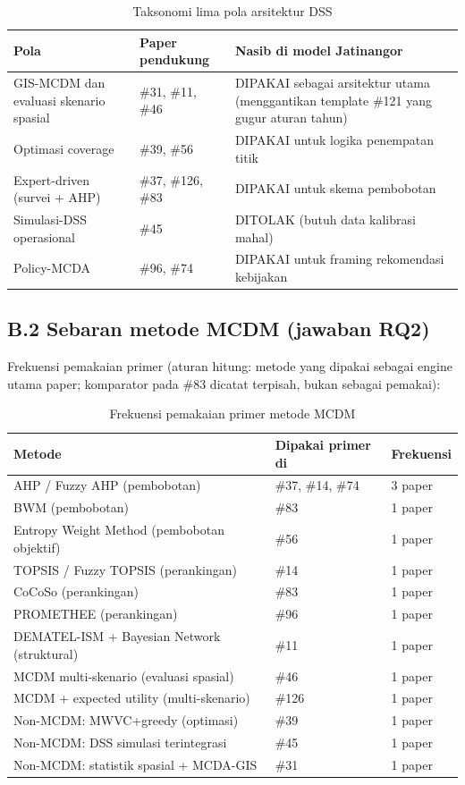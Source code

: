 \documentclass[a4paper,11pt]{article}
\begin{document}
\begin{table}[htbp]
\centering
\begin{tabular}{p{4.5cm}p{3.5cm}p{6.5cm}}
\toprule
\textbf{Pola} & \textbf{Paper pendukung} & \textbf{Nasib di model Jatinangor} \\
\midrule
GIS-MCDM dan evaluasi skenario spasial & \#31, \#11, \#46 & DIPAKAI sebagai arsitektur utama (menggantikan template \#121 yang gugur aturan tahun) \\
Optimasi coverage & \#39, \#56 & DIPAKAI untuk logika penempatan titik \\
Expert-driven (survei + AHP) & \#37, \#126, \#83 & DIPAKAI untuk skema pembobotan \\
Simulasi-DSS operasional & \#45 & DITOLAK (butuh data kalibrasi mahal) \\
Policy-MCDA & \#96, \#74 & DIPAKAI untuk framing rekomendasi kebijakan \\
\bottomrule
\end{tabular}
\caption{Taksonomi lima pola arsitektur DSS}
\end{table}

\subsection*{B.2 Sebaran metode MCDM (jawaban RQ2)}

Frekuensi pemakaian primer (aturan hitung: metode yang dipakai sebagai engine utama paper; komparator pada \#83 dicatat terpisah, bukan sebagai pemakai):

\begin{table}[htbp]
\centering
\begin{tabular}{p{6cm}p{4cm}p{2.5cm}}
\toprule
\textbf{Metode} & \textbf{Dipakai primer di} & \textbf{Frekuensi} \\
\midrule
AHP / Fuzzy AHP (pembobotan) & \#37, \#14, \#74 & 3 paper \\
BWM (pembobotan) & \#83 & 1 paper \\
Entropy Weight Method (pembobotan objektif) & \#56 & 1 paper \\
TOPSIS / Fuzzy TOPSIS (perankingan) & \#14 & 1 paper \\
CoCoSo (perankingan) & \#83 & 1 paper \\
PROMETHEE (perankingan) & \#96 & 1 paper \\
DEMATEL-ISM + Bayesian Network (struktural) & \#11 & 1 paper \\
MCDM multi-skenario (evaluasi spasial) & \#46 & 1 paper \\
MCDM + expected utility (multi-skenario) & \#126 & 1 paper \\
Non-MCDM: MWVC+greedy (optimasi) & \#39 & 1 paper \\
Non-MCDM: DSS simulasi terintegrasi & \#45 & 1 paper \\
Non-MCDM: statistik spasial + MCDA-GIS & \#31 & 1 paper \\
\bottomrule
\end{tabular}
\caption{Frekuensi pemakaian primer metode MCDM}
\end{table}
\end{document}
